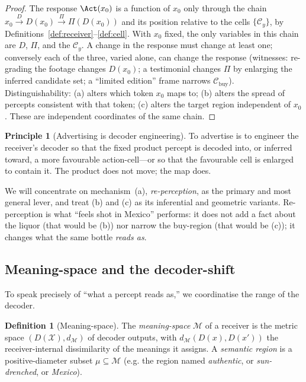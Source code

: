 \documentclass[twocolumn,11pt,a4paper]{article}
\theoremstyle{adv}
\theoremstyle{definition}
\newtheorem{definition}[theorem]{Definition}
\newtheorem{principle}[theorem]{Principle}
\theoremstyle{remark}
\newcommand{\Out}{\mathcal{X}}         %
\newcommand{\Cell}{\mathcal{C}}        %
\newcommand{\Dec}{D}                   %
\newcommand{\Proj}{\Pi}                %
\newcommand{\Mean}{\mathcal{M}}        %
\newcommand{\dist}{d}
\begin{document}
\begin{proof}
The response $\Act(x_0)$ is a function of $x_0$ only through the chain
$x_0 \xrightarrow{\Dec} \Dec(x_0)\xrightarrow{\Proj}\Proj(\Dec(x_0))$ and
its position relative to the cells $\{\Cell_y\}$, by
Definitions~\ref{def:receiver}--\ref{def:cell}. With $x_0$ fixed, the only
variables in this chain are $\Dec$, $\Proj$, and the $\Cell_y$. A change in
the response must change at least one; conversely each of the three, varied
alone, can change the response (witnesses: re-grading the footage changes
$\Dec(x_0)$; a testimonial changes $\Proj$ by enlarging the inferred
candidate set; a ``limited edition'' frame narrows $\Cell_{\text{buy}}$).
Distinguishability: (a) alters which token $x_0$ maps to; (b) alters the
spread of percepts consistent with that token; (c) alters the target
region independent of $x_0$. These are independent coordinates of the same
chain.
\end{proof}

\begin{principle}[Advertising is decoder engineering]
\label{prin:engineering}
To advertise is to engineer the receiver's decoder so that the fixed
product percept is decoded into, or inferred toward, a more favourable
action-cell---or so that the favourable cell is enlarged to contain it.
The product does not move; the map does.
\end{principle}

We will concentrate on mechanism~(a), \emph{re-perception}, as the primary
and most general lever, and treat (b) and (c) as its inferential and
geometric variants. Re-perception is what ``feels shot in Mexico''
performs: it does not add a fact about the liquor (that would be (b)) nor
narrow the buy-region (that would be (c)); it changes what the same bottle
\emph{reads as}.

\subsection{Meaning-space and the decoder-shift}

To speak precisely of ``what a percept reads as,'' we coordinatise the
range of the decoder.

\begin{definition}[Meaning-space]
\label{def:meaning}
The \emph{meaning-space} $\Mean$ of a receiver is the metric space
$(\Dec(\Out),\dist_{\Mean})$ of decoder outputs, with
$\dist_{\Mean}(\Dec(x),\Dec(x'))$ the receiver-internal dissimilarity of
the meanings it assigns. A \emph{semantic region} is a positive-diameter
subset $\mu\subseteq\Mean$ (e.g. the region named \emph{authentic},
or \emph{sun-drenched}, or \emph{Mexico}).
\end{definition}
\end{document}
